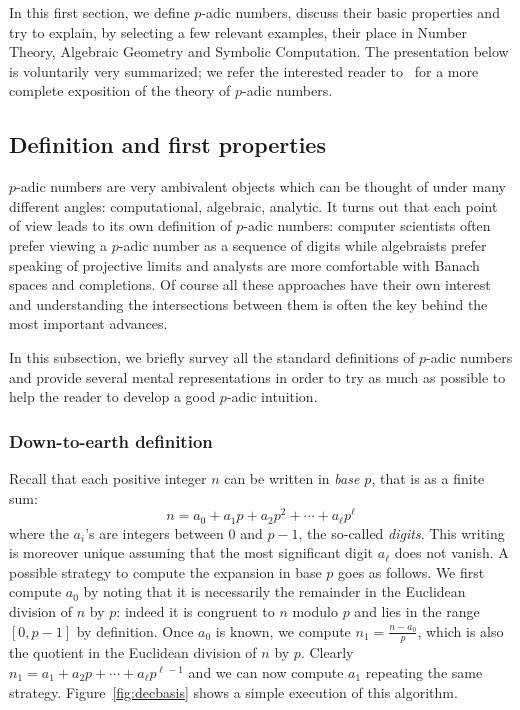 \documentclass[11pt]{article}
\numberwithin{equation}{section}
\numberwithin{figure}{section}
\theoremstyle{definition}
\begin{document}
In this first section, we define $p$-adic numbers, discuss their basic 
properties and try to explain, by selecting a few relevant examples, 
their place in Number Theory, Algebraic Geometry and Symbolic 
Computation. The presentation below is voluntarily very summarized; we 
refer the interested reader to~\cite{Am75,Go97} for a more complete 
exposition of the theory of $p$-adic numbers.

\subsection{Definition and first properties}

$p$-adic numbers are very ambivalent objects which can be thought of 
under many different angles: computational, algebraic, analytic. It 
turns out that each point of view leads to its own definition of 
$p$-adic numbers: computer scientists often prefer viewing a $p$-adic 
number as a sequence of digits while algebraists prefer speaking of 
projective limits and analysts are more comfortable with Banach spaces 
and completions. Of course all these approaches have their own interest 
and understanding the intersections between them is often the key behind 
the most important advances.

In this subsection, we briefly survey all the standard definitions of 
$p$-adic numbers and provide several mental representations in order to 
try as much as possible to help the reader to develop a good $p$-adic 
intuition.

\subsubsection{Down-to-earth definition}
\label{sssec:downtoearth}

Recall that each positive integer $n$ can be written in \emph{base $p$},
that is as a finite sum:
$$n = a_0 + a_1 p + a_2 p^2 + \cdots + a_\ell p^\ell$$
where the $a_i$'s are integers between $0$ and $p{-}1$, the so-called
\emph{digits}. This writing is moreover unique assuming that the most
significant digit $a_\ell$ does not vanish.
A possible strategy to compute the expansion in base $p$ goes as 
follows. We first compute $a_0$ by noting that it is necessarily the 
remainder in the Euclidean division of $n$ by $p$: indeed it is 
congruent to $n$ modulo $p$ and lies in the range $[0,p{-}1]$ by 
definition. Once $a_0$ is known, we compute $n_1 = \frac{n-a_0}p$, which 
is also the quotient in the Euclidean division of $n$ by $p$. Clearly
$n_1 = a_1 + a_2 p + \cdots + a_\ell p^{\ell-1}$
and we can now compute $a_1$ repeating the same strategy. 
Figure~\ref{fig:decbasis} shows a simple execution of this algorithm.
\end{document}
